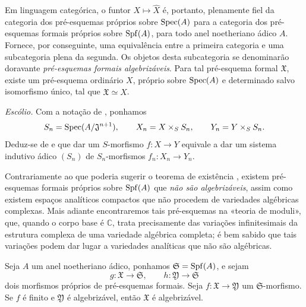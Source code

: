 Em linguagem categórica, o funtor
$X\mapsto\widehat{X}$ é, portanto, plenamente fiel
 da categoria dos pré-esquemas próprios sobre
$\operatorname{Spec}(A)$ para a categoria dos pré-esquemas formais próprios sobre
$\operatorname{Spf}(A)$, para todo anel noetheriano ádico $A$. Fornece, por
conseguinte, uma equivalência entre a primeira categoria e uma
subcategoria plena da segunda. Os objetos desta subcategoria se
denominarão doravante \emph{pré-esquemas formais algebrizáveis}.
Para tal pré-esquema formal $\mathfrak{X}$, existe um pré-esquema
ordinário $X$, próprio sobre $\operatorname{Spec}(A)$ e determinado salvo isomorfismo
único, tal que $\mathfrak{X}\simeq\widehat{X}$.

\begin{env}[5.4.2]
\label{III.5.4.2}
\emph{Escólio.}
Com a notação de , ponhamos
\[
  S_n=\operatorname{Spec}(A/\mathfrak{J}^{n+1}),\qquad
  X_n=X\times_S S_n,\qquad
  Y_n=Y\times_S S_n.
\]
Deduz-se de  e  que
dar um $S$-morfismo $f:X\to Y$ equivale a dar um sistema indutivo
ádico $(S_n)$  de
$S_n$-morfismos $f_n:X_n\to Y_n$.
\end{env}

\begin{remark}[5.4.3]
\label{III.5.4.3}
Contrariamente ao que poderia sugerir o teorema de existência
, existem pré-esquemas formais próprios sobre $\operatorname{Spf}(A)$
que \emph{não são algebrizáveis}, assim como existem espaços analíticos
compactos que não procedem de variedades algébricas complexas. Mais
adiante encontraremos tais pré-esquemas na «teoria de moduli»,
que, quando o corpo base é $\mathbb{C}$, trata precisamente das
variações infinitesimais da estrutura complexa de uma variedade
algébrica completa; é bem sabido que tais variações podem dar
lugar a variedades analíticas que não são algébricas.
\end{remark}

\begin{proposition}[5.4.4]
\label{III.5.4.4}
Seja $A$ um anel noetheriano ádico, ponhamos
$\mathfrak{S}=\operatorname{Spf}(A)$, e sejam
\[
  g:\mathfrak{X}\to\mathfrak{S},
  \qquad
  h:\mathfrak{Y}\to\mathfrak{S}
\]
dois morfismos próprios de pré-esquemas formais. Seja
$f:\mathfrak{X}\to\mathfrak{Y}$ um
$\mathfrak{S}$-morfismo. Se $f$ é finito e
$\mathfrak{Y}$ é algebrizável, então $\mathfrak{X}$ é
algebrizável.
\end{proposition}

